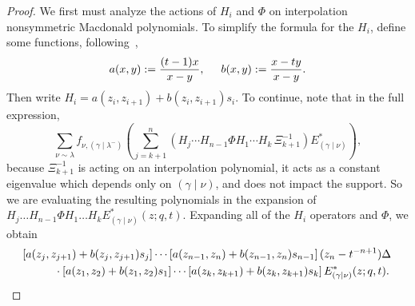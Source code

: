 \documentclass[ALCO]{cedram}
\newcommand{\Estar}[1]{E^*_{#1}}
\newcommand{\Estarlong}[1]{E^*_{#1}(z;q,t)}
\newcommand{\gammalambdamin}{{(\gamma \mid \lambda^-)}}
\newcommand{\gammanu}{{(\gamma \mid \nu)}}
\newcommand{\fnu}{f_{\nu, \gammalambdamin}}
\begin{document}
\begin{proof}

We first must analyze the actions of $H_i$ and $\Phi$ on interpolation nonsymmetric Macdonald polynomials. To simplify the formula for the $H_i$, define some functions, following~\cite{MR2525842},
\[ a(x,y) := \frac{(t-1)x}{x-y}, \hspace*{.5cm} b(x,y) := \frac{x-ty}{x-y}.\]
Then write $H_i = a(z_i,z_{i+1}) + b(z_i,z_{i+1}) s_i$. To continue, note that in the full expression,
\begin{equation}\label{rightside}\sum_{\nu \sim \lambda} \fnu\left( \sum_{j=k+1}^n \left( H_j \dotsm H_{n-1} \Phi H_1 \dotsm H_{k} \, \Xi_{k+1}^{-1} \right)  \Estar{\gammanu}\right),\end{equation}
because $\Xi^{-1}_{k+1}$ is acting on an interpolation polynomial, it acts as a constant eigenvalue which depends only on $\gammanu$, and does not impact the support. So we are evaluating the resulting polynomials in the expansion of $H_j \dots H_{n-1} \Phi H_1 \dots H_k \Estarlong{\gammanu}$. 
Expanding all of the $H_i$ operators and $\Phi$, we obtain
\begin{align*} &  [a(z_j,z_{j+1})+b(z_j,z_{j+1}) s_j] \dotsm [a(z_{n-1},z_n)+b(z_{n-1},z_n) s_{n-1}]\,    (z_n-t^{-n+1})\Delta \, \\& \hspace*{1cm} \cdot [a(z_1, z_2)+b(z_1,z_2) s_1] \dotsm [a(z_k,z_{k+1}) + b(z_k,z_{k+1})s_k] \, \Estarlong{\gammanu}.
\end{align*}




\end{proof}
\end{document}
